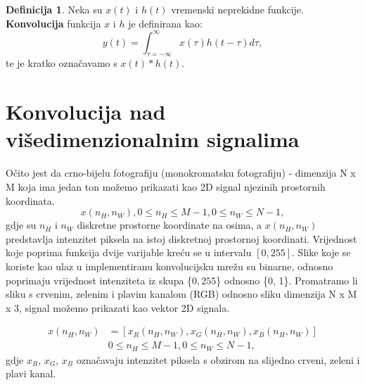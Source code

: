 \documentclass[times, utf8, diplomski]{fer}
\theoremstyle{definition}
\newtheorem{definition}{Definicija}[section]
\begin{document}
\begin{definition}
Neka su $x(t)$ i $h(t)$ vremenski neprekidne funkcije. \textbf{Konvolucija} funkcija $x$ i $h$ je definirana kao:
\begin{equation}
y(t) = \int_{\tau=-\infty}^{\infty}x(\tau)h(t-\tau)d\tau,
\end{equation}
te je kratko označavamo s $x(t) * h(t)$.
\end{definition}


\section{Konvolucija nad višedimenzionalnim signalima}
Očito jest da crno-bijelu fotografiju (monokromatsku fotografiju) - dimenzija N x M koja ima jedan ton možemo prikazati kao 2D signal njezinih prostornih koordinata.
\begin{equation}
x(n_H, n_W), 0\le n_H \le M-1, 0\le n_W \le N - 1,
\end{equation}
gdje su $n_H$ i $n_W$ diskretne prostorne koordinate na osima, a $x(n_H, n_W)$ predstavlja intenzitet piksela na istoj diskretnoj prostornoj koordinati. Vrijednost koje poprima funkcija dvije varijable kreću se u intervalu $[0, 255]$. Slike koje se koriste kao ulaz u implementiranu konvolucijsku mrežu su binarne, odnosno poprimaju vrijednost intenziteta iz skupa \{$0, 255$\} odnosno \{0, 1\}.\newline
Promatramo li sliku s crvenim, zelenim i plavim kanalom (RGB) odnosno sliku dimenzija N x M x 3, signal možemo prikazati kao vektor 2D signala.

\begin{align*}
x(n_H, n_W) &= [x_R(n_H, n_W), x_G(n_H, n_W), x_B(n_H, n_W)] \\
&0\le n_H \le M-1, 0\le n_W \le N - 1,
\end{align*}
gdje $x_R$, $x_G$, $x_B$ označavaju intenzitet piksela s obzirom na slijedno crveni, zeleni i plavi kanal.
\end{document}
